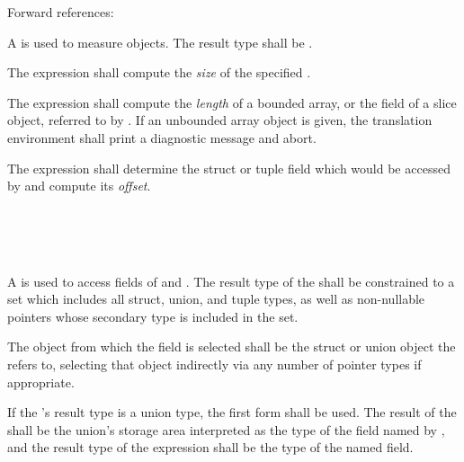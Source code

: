 Forward references: 

\specsubsubitem
A  is used to measure objects. The result
type shall be .

\specsubsubitem
The  expression shall compute the \textit{size} of the specified
.

\specsubsubitem
The  expression shall compute the \textit{length} of a bounded
array, or the  field of a slice object, referred to by
. If an unbounded array object is given, the translation
environment shall print a diagnostic message and abort.

\specsubsubitem
The  expression shall determine the struct or tuple field
which would be accessed by  and compute
its \textit{offset}.


\begin{grammar}
 \\
	   \\
	   \\
\end{grammar}

\specsubsubitem
A  is used to access fields of
 and . The result type
of the  shall be constrained to a set which
includes all struct, union, and tuple types, as well as non-nullable pointers
whose secondary type is included in the set.


\specsubsubitem
The object from which the field is selected shall be the struct or union object
the  refers to, selecting that object indirectly
via any number of pointer types if appropriate.

\specsubsubitem
If the 's result type is a union type, the
first form shall be used. The result of the
 shall be the union's storage area
interpreted as the type of the field named by , and the
result type of the expression shall be the type of the named field.

